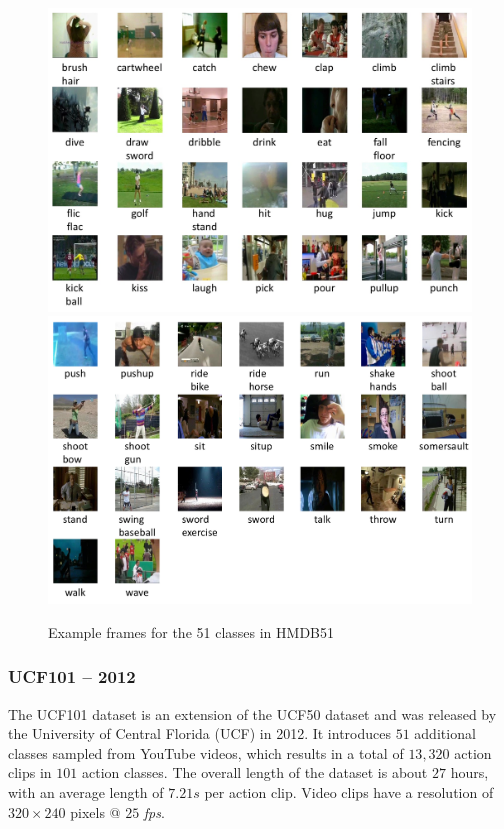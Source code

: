 \begin{figure}[H]
    \centering
    \includegraphics[width=\textwidth]{img_datasets/hmdb_classes1}
    \includegraphics[width=\textwidth]{img_datasets/hmdb_classes2}
    \caption{Example frames for the 51 classes in HMDB51 \cite{_serre_????}}
    \label{fig:hmdb_example}
\end{figure}


\subsubsection{UCF101 -- 2012}
The UCF101 dataset is an extension of the UCF50 dataset and was released by the University of Central Florida (UCF) in 2012.
It introduces $51$ additional classes sampled from YouTube videos, which results in a total of $13,320$ action clips in $101$ action classes.
The overall length of the dataset is about $27$ hours, with an average length of $7.21s$ per action clip.
Video clips have a resolution of $320 \times 240$ pixels @ $25$ \textit{fps}. \cite{soomro_ucf101:_2012}

